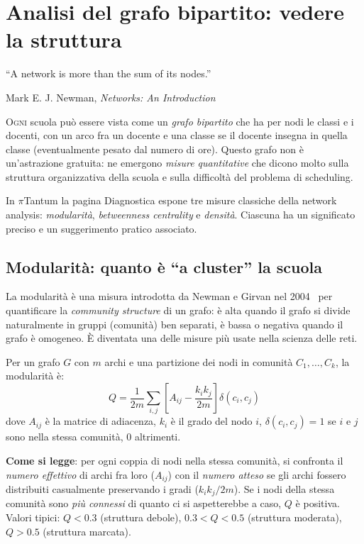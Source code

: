 \chapter{Analisi del grafo bipartito: vedere la struttura}
\label{ch:metodo_grafo}

\epigraph{``A network is more than the sum of its nodes.''}{Mark
E. J. Newman, \emph{Networks: An Introduction}~\parencite{newman2010}}

\lettrine[lines=3]{O}{gni} scuola pu\`o essere vista come un
\emph{grafo bipartito} che ha per nodi le classi e i docenti,
con un arco fra un docente e una classe se il docente
insegna in quella classe (eventualmente pesato dal numero di
ore). Questo grafo non \`e un'astrazione gratuita: ne
emergono \emph{misure quantitative} che dicono molto sulla
struttura organizzativa della scuola e sulla difficolt\`a del
problema di scheduling.

In $\pi$Tantum la pagina Diagnostica espone tre misure
classiche della network analysis:
\emph{modularit\`a},
\emph{betweenness centrality} e
\emph{densit\`a}. Ciascuna ha un
significato preciso e un suggerimento pratico associato.

\section{Modularit\`a: quanto \`e ``a cluster'' la scuola}

\begin{storiabox}
La modularit\`a \`e una misura introdotta da Newman e Girvan
nel 2004~\parencite{newman2004} per quantificare la \emph{community
structure} di un grafo: \`e alta quando il grafo si divide
naturalmente in gruppi (comunit\`a) ben separati, \`e bassa o
negativa quando il grafo \`e omogeneo. \`E diventata una delle
misure pi\`u usate nella scienza delle reti.
\end{storiabox}

\begin{defbox}
Per un grafo $G$ con $m$ archi e una partizione dei nodi in
comunit\`a $C_1, \ldots, C_k$, la modularit\`a \`e:
\[
  Q = \frac{1}{2m} \sum_{i,j} \left[ A_{ij} - \frac{k_i k_j}{2m}
                            \right] \delta(c_i, c_j)
\]
dove $A_{ij}$ \`e la matrice di adiacenza, $k_i$ \`e il grado
del nodo $i$, $\delta(c_i, c_j) = 1$ se $i$ e $j$ sono nella
stessa comunit\`a, 0 altrimenti.
\end{defbox}

\textbf{Come si legge}: per ogni coppia di nodi nella stessa
comunit\`a, si confronta il \emph{numero effettivo} di archi
fra loro ($A_{ij}$) con il \emph{numero atteso} se gli archi
fossero distribuiti casualmente preservando i gradi
($k_i k_j / 2m$). Se i nodi della stessa comunit\`a sono
\emph{pi\`u connessi} di quanto ci si aspetterebbe a caso, $Q$
\`e positiva. Valori tipici: $Q < 0.3$ (struttura debole),
$0.3 < Q < 0.5$ (struttura moderata), $Q > 0.5$ (struttura
marcata).

